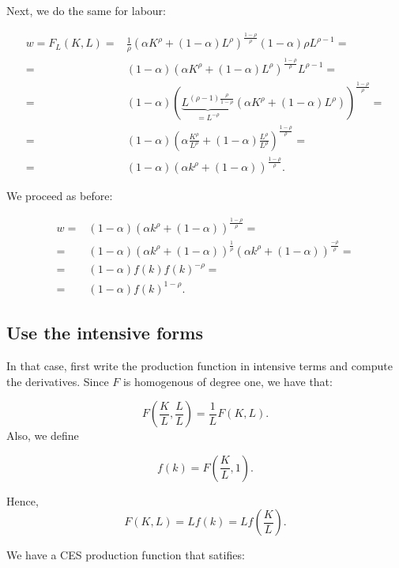 \documentclass[11pt,a4paper,english]{article}
\begin{document}
Next, we do the same for labour:

\begin{align*}
    w = F_{L}(K,L) =& \frac{1}{\rho}\left( \alpha K^\rho + (1-\alpha) L^\rho \right)^\frac{1-\rho}{\rho} (1-\alpha)\rho L^{\rho-1} = \\
    =& (1-\alpha) \left(\alpha K^\rho + (1-\alpha)L^\rho \right)^\frac{1-\rho}{\rho} L^{\rho-1} = \\
    =& (1-\alpha) \left( \underbrace{L^{(\rho-1)\frac{\rho}{1-\rho}}}_{=L^{-\rho}} \left( \alpha K^\rho + (1-\alpha) L^\rho \right)\right)^\frac{1-\rho}{\rho} = \\
    =& (1-\alpha) \left( \alpha \frac{K^\rho}{L^\rho} + (1-\alpha) \frac{L^\rho}{L^\rho}\right)^\frac{1-\rho}{\rho} = \\
    =& (1-\alpha) \left(\alpha k^\rho + (1-\alpha) \right)^\frac{1-\rho}{\rho}.
\end{align*}

We proceed as before:

\begin{align*}
    w =& (1-\alpha)\left(\alpha k^\rho + (1-\alpha)\right)^\frac{1-\rho}{\rho} = \\
    =& (1-\alpha)\left(\alpha k^\rho + (1-\alpha)\right)^\frac{1}{\rho}\left(\alpha k^\rho + (1-\alpha)\right)^\frac{-\rho}{\rho} = \\
        =& (1-\alpha)f(k)f(k)^{-\rho} = \\
        =& (1-\alpha)f(k)^{1-\rho}.
    \end{align*}

\subsection{Use the intensive forms}

In that case, first write the production function in intensive terms and compute the derivatives.
Since $F$ is homogenous of degree one, we have that:

$$F\left( \frac{K}{L}, \frac{L}{L} \right) = \frac{1}{L} F(K,L).$$
Also, we define

$$f(k) = F\left(\frac{K}{L}, 1\right).$$

Hence, $$F(K,L) = L f(k) = L f\left(\frac{K}{L}\right).$$

We have a CES production function that satifies:
\end{document}
